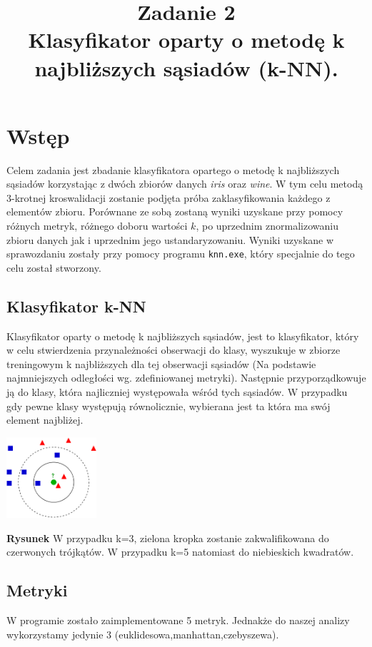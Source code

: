 \documentclass{classrep}
\author{
  \studentinfo{Natalia Mateuszuk}{203940} \and
  \studentinfo{Adrian Grzelak}{200242}
}
\title{Zadanie 2 \\
Klasyfikator oparty o metodę k najbliższych sąsiadów (k-NN).}
\begin{document}
\maketitle

\section{Wstęp}
Celem zadania jest zbadanie klasyfikatora opartego o metodę k najbliższych sąsiadów korzystając z dwóch zbiorów danych \citep{iris}\textit{iris} oraz \citep{wine}\textit{wine}. W tym celu metodą 3-krotnej kroswalidacji zostanie podjęta próba zaklasyfikowania każdego z elementów zbioru. Porównane ze sobą zostaną wyniki uzyskane przy pomocy różnych metryk, różnego doboru wartości $k$, po uprzednim znormalizowaniu zbioru danych jak i uprzednim jego ustandaryzowaniu. Wyniki uzyskane w sprawozdaniu zostały przy pomocy programu  \texttt{knn.exe}, który specjalnie do tego celu został stworzony.
\subsection{Klasyfikator k-NN}
Klasyfikator oparty o metodę k najbliższych sąsiadów, jest to klasyfikator, który w celu stwierdzenia przynależności obserwacji do klasy, wyszukuje w zbiorze treningowym k najbliższych dla tej obserwacji sąsiadów (Na podstawie najmniejszych odległości wg. zdefiniowanej metryki). Następnie przyporządkowuje ją do klasy, która najliczniej występowała wśród tych sąsiadów. W przypadku gdy pewne klasy występują równolicznie, wybierana jest ta która ma swój element najbliżej.
\begin{center}
	\includegraphics[height=3cm]{knn_vis.png}
	
	\textbf{Rysunek} \citep{wikipedia} W przypadku k=3, zielona kropka zostanie zakwalifikowana do czerwonych trójkątów. W przypadku k=5 natomiast do niebieskich kwadratów.
\end{center}
\subsection{Metryki}
W programie zostało zaimplementowane 5 metryk. Jednakże do naszej analizy wykorzystamy jedynie 3 (euklidesowa,manhattan,czebyszewa).
\end{document}
